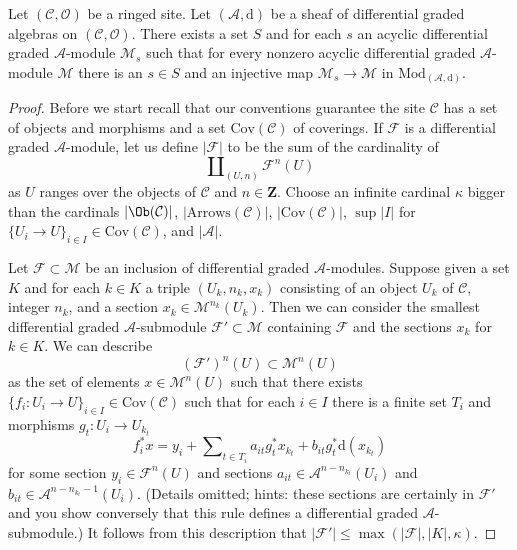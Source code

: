 \begin{lemma}
\label{lemma-small-acyclics}
Let $(\mathcal{C}, \mathcal{O})$ be a ringed site.
Let $(\mathcal{A}, \text{d})$ be a sheaf of differential graded algebras
on $(\mathcal{C}, \mathcal{O})$. There exists a set $S$ and for each $s$
an acyclic differential graded $\mathcal{A}$-module $\mathcal{M}_s$ such
that for every nonzero acyclic differential graded $\mathcal{A}$-module
$\mathcal{M}$ there is an $s \in S$ and an injective map
$\mathcal{M}_s \to \mathcal{M}$ in $\text{Mod}_{(\mathcal{A}, \text{d})}$.
\end{lemma}

\begin{proof}
Before we start recall that our conventions guarantee the site $\mathcal{C}$
has a set of objects and morphisms and a set $\text{Cov}(\mathcal{C})$
of coverings.
If $\mathcal{F}$
is a differential graded $\mathcal{A}$-module, let us define $|\mathcal{F}|$
to be the sum of the cardinality of
$$
\coprod\nolimits_{(U, n)} \mathcal{F}^n(U)
$$
as $U$ ranges over the objects of $\mathcal{C}$ and $n \in \mathbf{Z}$.
Choose an infinite cardinal $\kappa$ bigger than
the cardinals $|\Ob(\mathcal{C})|$, $|\text{Arrows}(\mathcal{C})|$,
$|\text{Cov}(\mathcal{C})|$, $\sup |I|$ for
$\{U_i \to U\}_{i \in I} \in \text{Cov}(\mathcal{C})$,
and $|\mathcal{A}|$.

\medskip\noindent
Let $\mathcal{F} \subset \mathcal{M}$ be an inclusion of
differential graded $\mathcal{A}$-modules.
Suppose given a set $K$ and for each $k \in K$ a triple
$(U_k, n_k, x_k)$ consisting of an object $U_k$ of $\mathcal{C}$,
integer $n_k$, and a section $x_k \in \mathcal{M}^{n_k}(U_k)$.
Then we can consider the smallest differential graded
$\mathcal{A}$-submodule $\mathcal{F}' \subset \mathcal{M}$
containing $\mathcal{F}$ and the sections $x_k$ for $k \in K$.
We can describe
$$
(\mathcal{F}')^n(U) \subset \mathcal{M}^n(U)
$$
as the set of elements $x \in \mathcal{M}^n(U)$ such that there
exists $\{f_i : U_i \to U\}_{i \in I} \in \text{Cov}(\mathcal{C})$ such that
for each $i \in I$ there is a finite set $T_i$ and morphisms
$g_t : U_i \to U_{k_t}$
$$
f_i^*x = y_i +
\sum\nolimits_{t \in T_i} a_{it}g_t^*x_{k_t} + b_{it}g_t^*\text{d}(x_{k_t})
$$
for some section $y_i \in \mathcal{F}^n(U)$ and
sections $a_{it} \in \mathcal{A}^{n - n_{k_t}}(U_i)$
and $b_{it} \in \mathcal{A}^{n - n_{k_t} - 1}(U_i)$.
(Details omitted; hints: these sections are certainly in $\mathcal{F}'$
and you show conversely that this rule defines a differential
graded $\mathcal{A}$-submodule.)
It follows from this description that
$|\mathcal{F}'| \leq \max(|\mathcal{F}|, |K|, \kappa)$.


\end{proof}
